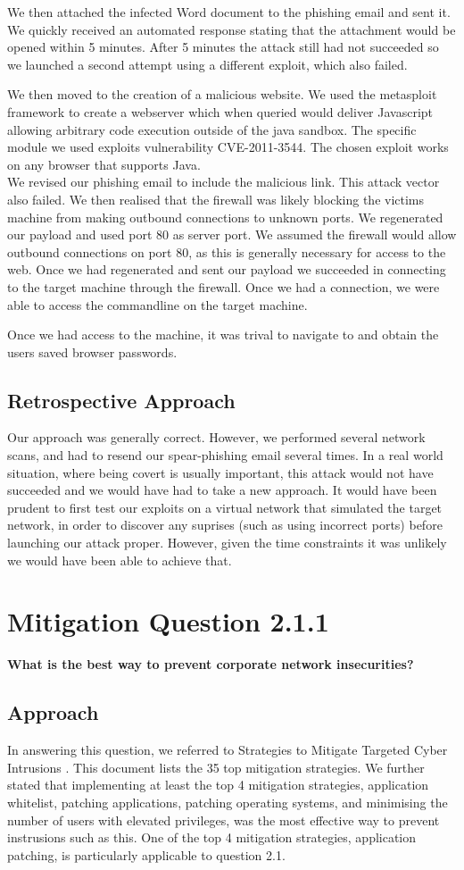 We then attached the infected Word document to the phishing email and sent it. We quickly received an automated response stating that the attachment would be opened within 5 minutes. After 5 minutes the attack still had not succeeded so we launched a second attempt using a different exploit, which also failed.

We then moved to the creation of a malicious website. We used the metasploit framework to create a webserver which when queried would deliver Javascript allowing arbitrary code execution outside of the java sandbox. The specific module we used exploits vulnerability CVE-2011-3544. The chosen exploit works on any browser that supports Java.\\
We revised our phishing email to include the malicious link. This attack vector also failed. We then realised that the firewall was likely blocking the victims machine from making outbound connections to unknown ports. We regenerated our payload and used port 80 as server port. We assumed the firewall would allow outbound connections on port 80, as this is generally necessary for access to the web. Once we had regenerated and sent our payload we succeeded in connecting to the target machine through the firewall. Once we had a connection, we were able to access the commandline on the target machine.

Once we had access to the machine, it was trival to navigate to and obtain the users saved browser passwords.
\subsection{Retrospective Approach}
Our approach was generally correct. However, we performed several network scans, and had to resend our spear-phishing email several times. In a real world situation, where being covert is usually important, this attack would not have succeeded and we would have had to take a new approach. It would have been prudent to first test our exploits on a virtual network that simulated the target network, in order to discover any suprises (such as using incorrect ports) before launching our attack proper. However, given the time constraints it was unlikely we would have been able to achieve that. 
\section{Mitigation Question 2.1.1}
\textbf{What is the best way to prevent corporate network insecurities?}
\subsection{Approach}
In answering this question, we referred to Strategies to Mitigate Targeted Cyber Intrusions \cite{dsd}. This document lists the 35 top mitigation strategies. We further stated that implementing at least the top 4 mitigation strategies, application whitelist, patching applications, patching operating systems, and minimising the number of users with elevated privileges, was the most effective way to prevent instrusions such as this. One of the top 4 mitigation strategies, application patching, is particularly applicable to question 2.1. 
